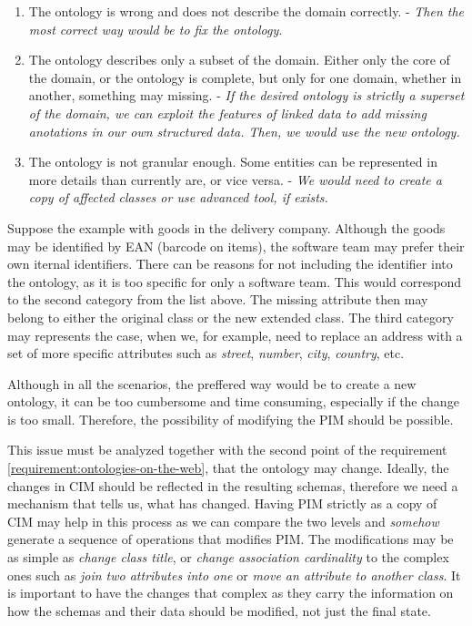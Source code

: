 \begin{enumerate}
    \item The ontology is wrong and does not describe the domain correctly. - \textit{Then the most correct way would be to fix the ontology.}
    \item The ontology describes only a subset of the domain. Either only the core of the domain, or the ontology is complete, but only for one domain, whether in another, something may missing. - \textit{If the desired ontology is strictly a superset of the domain, we can exploit the features of linked data to add missing anotations in our own structured data. Then, we would use the new ontology.}
    \item The ontology is not granular enough. Some entities can be represented in more details than currently are, or vice versa. - \textit{We would need to create a copy of affected classes or use advanced tool, if exists.}
\end{enumerate}

Suppose the example with goods in the delivery company. Although the goods may be identified by EAN (barcode on items), the software team may prefer their own iternal identifiers. There can be reasons for not including the identifier into the ontology, as it is too specific for only a software team. This would correspond to the second category from the list above. The missing attribute then may belong to either the original class or the new extended class. The third category may represents the case, when we, for example, need to replace an address with a set of more specific attributes such as \textit{street}, \textit{number}, \textit{city}, \textit{country}, etc.

Although in all the scenarios, the preffered way would be to create a new ontology, it can be too cumbersome and time consuming, especially if the change is too small. Therefore, the possibility of modifying the PIM should be possible.

\smallskip

This issue must be analyzed together with the second point of the requirement \ref{requirement:ontologies-on-the-web}, that the ontology may change. Ideally, the changes in CIM should be reflected in the resulting schemas, therefore we need a mechanism that tells us, what has changed. Having PIM strictly as a copy of CIM may help in this process as we can compare the two levels and \textit{somehow} generate a sequence of operations that modifies PIM. The modifications may be as simple as \textit{change class title}, or \textit{change association cardinality} to the complex ones such as \textit{join two attributes into one} or \textit{move an attribute to another class}. It is important to have the changes that complex as they carry the information on how the schemas and their data should be modified, not just the final state.

